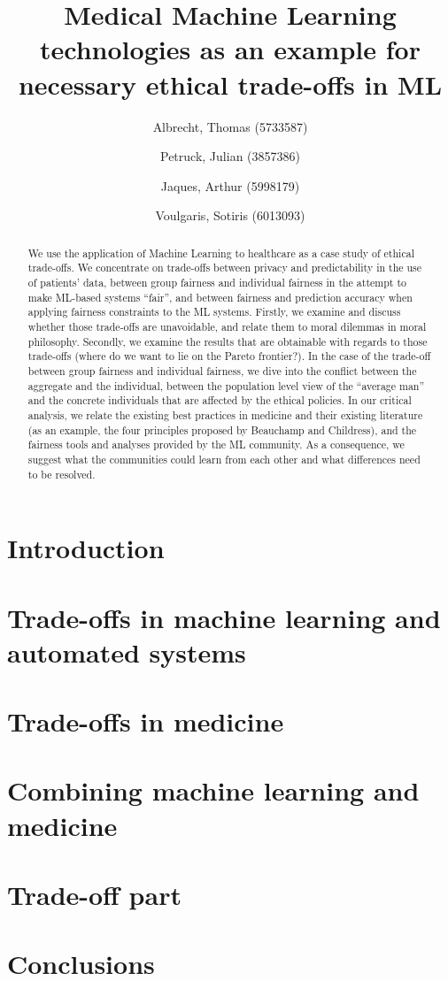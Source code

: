 \documentclass[11pt,english]{article}
\title{Medical Machine Learning technologies as an example for necessary ethical trade-offs in ML}
\author{
    Albrecht, Thomas (5733587)
    \and
    Petruck, Julian (3857386)
    \and
    Jaques, Arthur (5998179)
    \and Voulgaris, Sotiris (6013093)}
\begin{document}
\maketitle

\begin{abstract}
	We use the application of Machine Learning to healthcare as a case study of ethical trade-offs.
	We concentrate on trade-offs between privacy and predictability in the use of patients' data, between group fairness and individual fairness in the attempt to make ML-based systems ``fair'', and between fairness and prediction accuracy when applying fairness constraints to the ML systems.
	Firstly, we examine and discuss whether those trade-offs are unavoidable, and relate them to moral dilemmas in moral philosophy.
	Secondly, we examine the results that are obtainable with regards to those trade-offs (where do we want to lie on the Pareto frontier?).
	In the case of the trade-off between group fairness and individual fairness, we dive into the conflict between the aggregate and the individual, between the population level view of the ``average man'' and the concrete individuals that are affected by the ethical policies.
	In our critical analysis, we relate the existing best practices in medicine and their existing literature (as an example, the four principles proposed by Beauchamp and Childress), and the fairness tools and analyses provided by the ML community.
	As a consequence, we suggest what the communities could learn from each other and what differences need to be resolved.
\end{abstract}


\setcounter{tocdepth}{2}
\tableofcontents



\section{Introduction}


\section{Trade-offs in machine learning and automated systems}


\section{Trade-offs in medicine}


\section{Combining machine learning and medicine}


\section{Trade-off part}


\section{Conclusions}

\clearpage


\printbibliography
\end{document}
